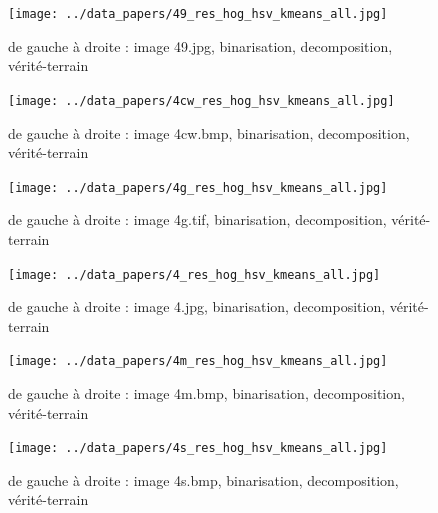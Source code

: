 \documentclass{book}
\begin{document}
\begin{figure}[H]
\begin{center}
\texttt{[image: ../data\_papers/49\_res\_hog\_hsv\_kmeans\_all.jpg]}
\end{center}
\caption{de gauche à droite : image 49.jpg, binarisation, decomposition, vérité-terrain}
\label{49}
\end{figure}
\clearpage


\begin{figure}[H]
\begin{center}
\texttt{[image: ../data\_papers/4cw\_res\_hog\_hsv\_kmeans\_all.jpg]}
\end{center}
\caption{de gauche à droite : image 4cw.bmp, binarisation, decomposition, vérité-terrain}
\label{4cw}
\end{figure}
\clearpage


\begin{figure}[H]
\begin{center}
\texttt{[image: ../data\_papers/4g\_res\_hog\_hsv\_kmeans\_all.jpg]}
\end{center}
\caption{de gauche à droite : image 4g.tif, binarisation, decomposition, vérité-terrain}
\label{4g}
\end{figure}
\clearpage


\begin{figure}[H]
\begin{center}
\texttt{[image: ../data\_papers/4\_res\_hog\_hsv\_kmeans\_all.jpg]}
\end{center}
\caption{de gauche à droite : image 4.jpg, binarisation, decomposition, vérité-terrain}
\label{4}
\end{figure}
\clearpage


\begin{figure}[H]
\begin{center}
\texttt{[image: ../data\_papers/4m\_res\_hog\_hsv\_kmeans\_all.jpg]}
\end{center}
\caption{de gauche à droite : image 4m.bmp, binarisation, decomposition, vérité-terrain}
\label{4m}
\end{figure}
\clearpage


\begin{figure}[H]
\begin{center}
\texttt{[image: ../data\_papers/4s\_res\_hog\_hsv\_kmeans\_all.jpg]}
\end{center}
\caption{de gauche à droite : image 4s.bmp, binarisation, decomposition, vérité-terrain}
\label{4s}
\end{figure}
\clearpage
\end{document}
